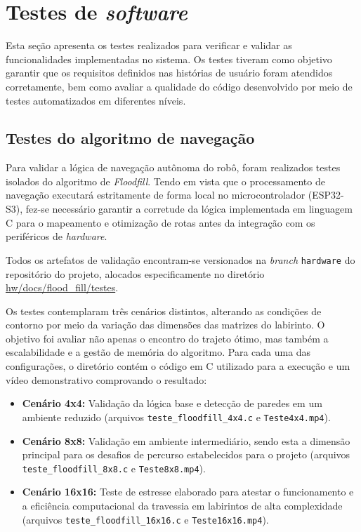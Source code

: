 \section{Testes de \textit{software}}

Esta seção apresenta os testes realizados para verificar e validar as funcionalidades implementadas no sistema. Os testes tiveram como objetivo garantir que os requisitos definidos nas histórias de usuário foram atendidos corretamente, bem como avaliar a qualidade do código desenvolvido por meio de testes automatizados em diferentes níveis.

\subsection{Testes do algoritmo de navegação}

Para validar a lógica de navegação autônoma do robô, foram realizados testes isolados do algoritmo de \textit{Floodfill}. Tendo em vista que o processamento de navegação executará estritamente de forma local no microcontrolador (ESP32-S3), fez-se necessário garantir a corretude da lógica implementada em linguagem C para o mapeamento e otimização de rotas antes da integração com os periféricos de \textit{hardware}.

Todos os artefatos de validação encontram-se versionados na \textit{branch} \texttt{hardware} do repositório do projeto, alocados especificamente no diretório \href{https://github.com/fcte-pi1/2026.1_PI1_Grupo01_Bruno/tree/hardware/hw/docs/flood_fill/testes}{hw/docs/flood\_fill/testes}. 

Os testes contemplaram três cenários distintos, alterando as condições de contorno por meio da variação das dimensões das matrizes do labirinto. O objetivo foi avaliar não apenas o encontro do trajeto ótimo, mas também a escalabilidade e a gestão de memória do algoritmo. Para cada uma das configurações, o diretório contém o código em C utilizado para a execução e um vídeo demonstrativo comprovando o resultado:

\begin{itemize}
    \item \textbf{Cenário 4x4:} Validação da lógica base e detecção de paredes em um ambiente reduzido (arquivos \texttt{teste\_floodfill\_4x4.c} e \texttt{Teste4x4.mp4}).
    \item \textbf{Cenário 8x8:} Validação em ambiente intermediário, sendo esta a dimensão principal para os desafios de percurso estabelecidos para o projeto (arquivos \texttt{teste\_floodfill\_8x8.c} e \texttt{Teste8x8.mp4}).
    \item \textbf{Cenário 16x16:} Teste de estresse elaborado para atestar o funcionamento e a eficiência computacional da travessia em labirintos de alta complexidade (arquivos \texttt{teste\_floodfill\_16x16.c} e \texttt{Teste16x16.mp4}).
\end{itemize}

